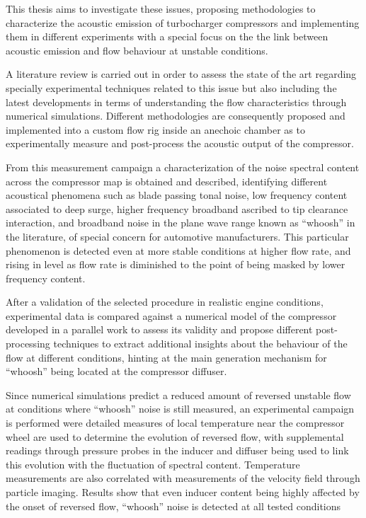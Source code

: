 \documentclass[final,twoside,11pt]{book}
\numberwithin{equation}{section}
\numberwithin{figure}{chapter}
\numberwithin{table}{chapter}
\begin{document}
This thesis aims to investigate these issues, proposing methodologies to characterize the acoustic emission of turbocharger compressors and implementing them in different experiments with a special focus on the the link between acoustic emission and flow behaviour at unstable conditions.

A literature review is carried out in order to assess the state of the art regarding specially experimental techniques related to this issue but also including the latest developments in terms of understanding the flow characteristics through numerical simulations. Different methodologies are consequently proposed and implemented into a custom flow rig inside an anechoic chamber as to experimentally measure and post-process the acoustic output of the compressor.

From this measurement campaign a characterization of the noise spectral content across the compressor map is obtained and described, identifying different acoustical phenomena such as blade passing tonal noise, low frequency content associated to deep surge, higher frequency broadband ascribed to tip clearance interaction, and broadband noise in the plane wave range known as ``whoosh'' in the literature, of special concern for automotive manufacturers. This particular phenomenon is detected even at more stable conditions at higher flow rate, and rising in level as flow rate is diminished to the point of being masked by lower frequency content.

After a validation of the selected procedure in realistic engine conditions, experimental data is compared against a numerical model of the compressor developed in a parallel work to assess its validity and propose different post-processing techniques to extract additional insights about the behaviour of the flow at different conditions, hinting at the main generation mechanism for ``whoosh'' being located at the compressor diffuser.

Since numerical simulations predict a reduced amount of reversed unstable flow at conditions where ``whoosh'' noise is still measured, an experimental campaign is performed were detailed measures of local temperature near the compressor wheel are used to determine the evolution of reversed flow, with supplemental readings through pressure probes in the inducer and diffuser being used to link this evolution with the fluctuation of spectral content. Temperature measurements are also correlated with measurements of the velocity field through particle imaging. Results show that even inducer content being highly affected by the onset of reversed flow, ``whoosh'' noise is detected at all tested conditions
\end{document}

